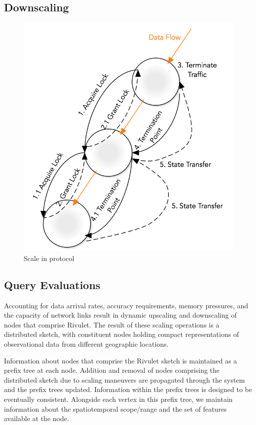 \subsection{Downscaling}
\begin{figure}
    \centerline{\includegraphics[scale=0.55]{figures/scale-in-protocol.png}}
    \caption{Scale in protocol}
    \label{fig:scale-in-protocol}
\end{figure}

\subsection{Query Evaluations}
\label{subsec:query-eval}
Accounting for data arrival rates, accuracy requirements, memory pressures, and the capacity of network links result in dynamic upscaling and downscaling of nodes that comprise Rivulet. The result of these scaling operations is a distributed sketch, with constituent nodes holding compact representations of observational data from different geographic locations. 

Information about nodes that comprise the Rivulet sketch is maintained as a prefix tree at each node. Addition and removal of nodes comprising the distributed sketch due to scaling maneuvers are propagated through the system and the prefix trees updated. Information within the prefix trees is designed to be eventually consistent.  Alongside each vertex in this prefix tree, we maintain information about the spatiotemporal scope/range and the set of features available at the node.  

